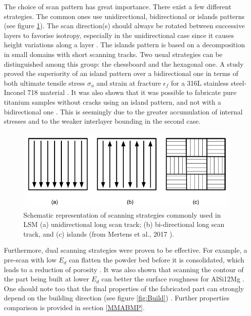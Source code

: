 The choice of scan pattern has great importance. There exist a few different strategies. The common ones use unidirectional, bidirectional or islands patterns (see figure \ref{fig:Strat}). The scan direction(s) should always be rotated between successive layers to favorise isotropy, especially in the unidirectional case since it causes height variations along a layer \parencite{aboulkhair2016}. The islands pattern is based on a decomposition in small domains with short scanning tracks. Two usual strategies can be distinguished among this group: the chessboard and the hexagonal one. A study proved the superiority of an island pattern over a bidirectional one in terms of both ultimate tensile stress $\sigma_u$ and strain at fracture $\epsilon_f$ for a 316L stainless steel-Inconel 718 material \parencite{Zhou15}. It was also shown that it was possible to fabricate pure titanium samples without cracks using an island pattern, and not with a bidirectional one \parencite{Li17}. This is seemingly due to the greater accumulation of internal stresses and to the weaker interlayer bounding in the second case. \\

\begin{figure}[ht]
\centering
\includegraphics[scale=0.6]{Images/Strat}
\decoRule
\caption[Schematic representation of scanning strategies commonly used in LSM (a) unidirectional long scan track; (b) bi-directional long scan track, and (c) islands]{Schematic representation of scanning strategies commonly used in LSM (a) unidirectional long scan track; (b) bi-directional long scan track, and (c) islands (from Mertens et al., 2017 \parencite{Mertens170406}).}
\label{fig:Strat}
\end{figure}

Furthermore, dual scanning strategies were proven to be effective. For example, a pre-scan with low $E_d$ can flatten the powder bed before it is consolidated, which leads to a reduction of porosity \parencite{Mertens170406}. It was also shown that scanning the contour of the part being built at lower $E_d$ can better the surface roughness for AlSi12Mg \parencite{PRASHANTH170205}. One should note too that the final properties of the fabricated part can strongly depend on the building direction (see figure \ref{fig:Build}) \parencite{DELROISSE201732}. Further properties comparison is provided in section \ref{MMABMP}.\\

